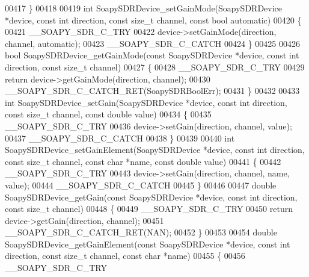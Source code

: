 \begin{DoxyCode}
00417 \}
00418 
00419 \textcolor{keywordtype}{int} SoapySDRDevice_setGainMode(SoapySDRDevice *device, \textcolor{keyword}{const} \textcolor{keywordtype}{int} direction, \textcolor{keyword}{const} \textcolor{keywordtype}{size\_t} channel, \textcolor{keyword}{const} \textcolor{keywordtype}{
      bool} automatic)
00420 \{
00421     __SOAPY_SDR_C_TRY
00422     device->setGainMode(direction, channel, automatic);
00423     __SOAPY_SDR_C_CATCH
00424 \}
00425 
00426 \textcolor{keywordtype}{bool} SoapySDRDevice_getGainMode(\textcolor{keyword}{const} SoapySDRDevice *device, \textcolor{keyword}{const} \textcolor{keywordtype}{int} direction, \textcolor{keyword}{const} \textcolor{keywordtype}{size\_t} channel)
00427 \{
00428     __SOAPY_SDR_C_TRY
00429     \textcolor{keywordflow}{return} device->getGainMode(direction, channel);
00430     __SOAPY_SDR_C_CATCH_RET(SoapySDRBoolErr);
00431 \}
00432 
00433 \textcolor{keywordtype}{int} SoapySDRDevice_setGain(SoapySDRDevice *device, \textcolor{keyword}{const} \textcolor{keywordtype}{int} direction, \textcolor{keyword}{const} \textcolor{keywordtype}{size\_t} channel, \textcolor{keyword}{const} \textcolor{keywordtype}{double} 
      value)
00434 \{
00435     __SOAPY_SDR_C_TRY
00436     device->setGain(direction, channel, value);
00437     __SOAPY_SDR_C_CATCH
00438 \}
00439 
00440 \textcolor{keywordtype}{int} SoapySDRDevice_setGainElement(SoapySDRDevice *device, \textcolor{keyword}{const} \textcolor{keywordtype}{int} direction, \textcolor{keyword}{const} \textcolor{keywordtype}{size\_t} channel, \textcolor{keyword}{const} \textcolor{keywordtype}{
      char} *name, \textcolor{keyword}{const} \textcolor{keywordtype}{double} value)
00441 \{
00442     __SOAPY_SDR_C_TRY
00443     device->setGain(direction, channel, name, value);
00444     __SOAPY_SDR_C_CATCH
00445 \}
00446 
00447 \textcolor{keywordtype}{double} SoapySDRDevice_getGain(\textcolor{keyword}{const} SoapySDRDevice *device, \textcolor{keyword}{const} \textcolor{keywordtype}{int} direction, \textcolor{keyword}{const} \textcolor{keywordtype}{size\_t} channel)
00448 \{
00449     __SOAPY_SDR_C_TRY
00450     \textcolor{keywordflow}{return} device->getGain(direction, channel);
00451     __SOAPY_SDR_C_CATCH_RET(NAN);
00452 \}
00453 
00454 \textcolor{keywordtype}{double} SoapySDRDevice_getGainElement(\textcolor{keyword}{const} SoapySDRDevice *device, \textcolor{keyword}{const} \textcolor{keywordtype}{int} direction, \textcolor{keyword}{const} \textcolor{keywordtype}{size\_t} 
      channel, \textcolor{keyword}{const} \textcolor{keywordtype}{char} *name)
00455 \{
00456     __SOAPY_SDR_C_TRY

\end{DoxyCode}
